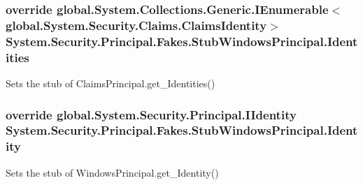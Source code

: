 \hypertarget{class_system_1_1_security_1_1_principal_1_1_fakes_1_1_stub_windows_principal_a8eae4075a00aa90bf53e587d2d396c92}{
\subsubsection[{Identities}]{\setlength{\rightskip}{0pt plus 5cm}override global.\-System.\-Collections.\-Generic.\-I\-Enumerable$<$global.\-System.\-Security.\-Claims.\-Claims\-Identity$>$ System.\-Security.\-Principal.\-Fakes.\-Stub\-Windows\-Principal.\-Identities\hspace{0.3cm}{\ttfamily [get]}}}\label{class_system_1_1_security_1_1_principal_1_1_fakes_1_1_stub_windows_principal_a8eae4075a00aa90bf53e587d2d396c92}


Sets the stub of Claims\-Principal.\-get\-\_\-\-Identities()

\hypertarget{class_system_1_1_security_1_1_principal_1_1_fakes_1_1_stub_windows_principal_ae83e497a9ac746495144e663363e76b3}{
\subsubsection[{Identity}]{\setlength{\rightskip}{0pt plus 5cm}override global.\-System.\-Security.\-Principal.\-I\-Identity System.\-Security.\-Principal.\-Fakes.\-Stub\-Windows\-Principal.\-Identity\hspace{0.3cm}{\ttfamily [get]}}}\label{class_system_1_1_security_1_1_principal_1_1_fakes_1_1_stub_windows_principal_ae83e497a9ac746495144e663363e76b3}


Sets the stub of Windows\-Principal.\-get\-\_\-\-Identity()

